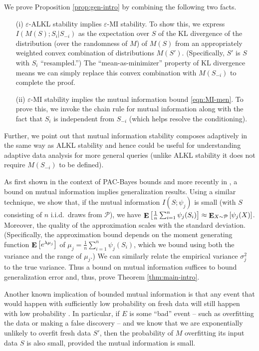 \documentclass[final,12pt]{colt2018}
\newcommand{\ex}[2]{{\ifx&#1& \E \else \E_{#1} \fi \left[#2\right]}}
\providecommand{\cP}{{\mathcal P}}
\begin{document}
We prove Proposition \ref{prop:gen-intro} by combining the following two facts.
\begin{itemize}
\item[(i)] $\varepsilon$-ALKL stability implies $\varepsilon$-MI stability. To show this, we express $I(M(S);S_i|S_{-i})$ as the expectation over $S$ of the KL divergence of the distribution (over the randomness of $M$) of $M(S)$ from an appropriately weighted convex combination of distributions $M(S')$. (Specifically, $S'$ is $S$ with $S_i$ ``resampled.'') The ``mean-as-minimizer'' property of KL divergence means we can simply replace this convex combination with $M(S_{-i})$ to complete the proof.
\item[(ii)] $\varepsilon$-MI stability implies the mutual information bound \eqref{eqn:MI-men}. To prove this, we invoke the chain rule for mutual information along with the fact that $S_i$ is independent from $S_{-i}$ (which helps resolve the conditioning).
\end{itemize}
Further,  we point out that mutual information stability composes adaptively in the same way as ALKL stability and hence could be useful for understanding adaptive data analysis for more general queries (\eg unlike ALKL stability it does not require $M(S_{-i})$ to be defined).


As first shown in the context of PAC-Bayes bounds \citep{McAllester13} and more recently in \citep{RussoZ16}, a bound on mutual information implies generalization results. Using a similar technique, we show that, if the mutual information $I(S;\psi_j)$ is small (with $S$ consisting of $n$ i.i.d.~draws from $\cP$), we have $\ex{}{\frac{1}{n} \sum_{i=1}^n \psi_j(S_i)} \approx \ex{X \sim \cP}{\psi_j(X)}$. Moreover, the quality of the approximation scales with the standard deviation. (Specifically, the approximation bound depends on the moment generating function $\ex{}{e^{\lambda \mu_j}}$ of $\mu_j = \frac{1}{n} \sum_{i=1}^n \psi_j(S_i)$, which we bound using both the variance and the range of $\mu_j$.) We can similarly relate the empirical variance $\sigma_j^2$ to the true variance. Thus a bound on mutual information suffices to bound generalization error and, thus, prove Theorem \ref{thm:main-intro}.

Another known implication of bounded mutual information is that any event that would happen with sufficiently low probability on fresh data will still happen with low probability \citep{RussoZ16,RogersRST16}. In particular, if $E$ is some ``bad'' event -- such as overfitting the data or making a false discovery -- and we know that we are exponentially unlikely to overfit fresh data $S'$, then the probability of $M$ overfitting its input data $S$ is also small, provided the mutual information is small.
\end{document}
